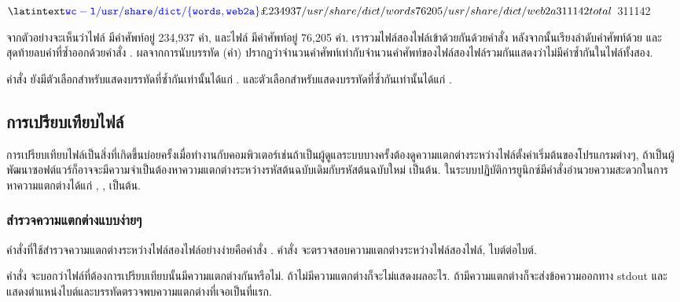 \begin{thwbr}
\begin{MyExample}
\begin{MyEx}
$ \cin{wc -l /usr/share/dict/\{words,web2a\}}
 234937 /usr/share/dict/words
  76205 /usr/share/dict/web2a
 311142 total
$ 
311142
\end{MyEx}
\end{MyExample}
จากตัวอย่างจะเห็นว่าไฟล์  มีคำศัพท์อยู่ 234,937 คำ, และไฟล์  มีคำศัพท์อยู่ 76,205 คำ. เรารวมไฟล์สองไฟล์เข้าด้วยกันด้วยคำสั่ง  หลังจากนั้นเรียงลำดับคำศัพท์ด้วย  และสุดท้ายลบคำที่ซ้ำออกด้วยคำสั่ง . ผลจากการนับบรรทัด (คำ) ปรากฏว่าจำนวนคำศัพท์เท่ากับจำนวนคำศัพท์ของไฟล์สองไฟล์รวมกันแสดงว่าไม่มีคำซ้ำกันในไฟล์ทั้งสอง. 

คำสั่ง  ยังมีตัวเลือกสำหรับแสดงบรรทัดที่ซ้ำกันเท่านั้นได้แก่ . และตัวเลือกสำหรับแสดงบรรทัดที่ซ้ำกันเท่านั้นได้แก่ .


\subsection{การเปรียบเทียบไฟล์}
การเปรียบเทียบไฟล์เป็นสิ่งที่เกิดขึ้นบ่อยครั้งเมื่อทำงานกับคอมพิวเตอร์เช่นถ้าเป็นผู้ดูแลระบบบางครั้งต้องดูความแตกต่างระหว่างไฟล์ตั้งค่าเริ่มต้นของโปรแกรมต่างๆ, ถ้าเป็นผู้พัฒนาซอฟต์แวร์ก็อาจจะมีความจำเป็นต้องหาความแตกต่างระหว่างรหัสต้นฉบับเดิมกับรหัสต้นฉบับใหม่ เป็นต้น. ในระบบปฏิบัติการยูนิกซ์มีคำสั่งอำนวยความสะดวกในการหาความแตกต่างได้แก่ , ,  เป็นต้น.

\subsubsection{สำรวจความแตกต่างแบบง่ายๆ}
คำสั่งที่ใช้สำรวจความแตกต่างระหว่างไฟล์สองไฟล์อย่างง่ายคือคำสั่ง . คำสั่ง  จะตรวจสอบความแตกต่างระหว่างไฟล์สองไฟล์, ไบต์ต่อไบต์. 
\begin{MyExample}
\end{MyExample}%
คำสั่ง  จะบอกว่าไฟล์ที่ต้องการเปรียบเทียบนั้นมีความแตกต่างกันหรือไม่. ถ้าไม่มีความแตกต่างก็จะไม่แสดงผลอะไร. ถ้ามีความแตกต่างก็จะส่งข้อความออกทาง stdout และแสดงตำแหน่งไบต์และบรรทัดตรวจพบความแตกต่างที่เจอเป็นที่แรก.



\end{thwbr}
